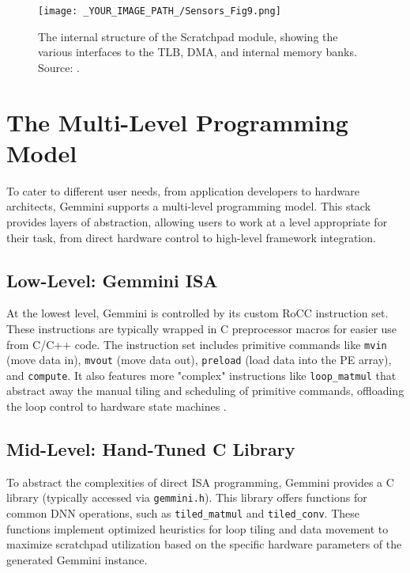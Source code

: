 \begin{figure}[htbp]
    \centering
    \texttt{[image: \_YOUR\_IMAGE\_PATH\_/Sensors\_Fig9.png]}
    \caption{The internal structure of the Scratchpad module, showing the various interfaces to the TLB, DMA, and internal memory banks. Source: \cite{gookyi2023gemmini_case_study}.}
    \label{fig:scratchpad_module}
\end{figure}

\section{The Multi-Level Programming Model}
\label{sec:gemmini_programming_model}

To cater to different user needs, from application developers to hardware architects, Gemmini supports a multi-level programming model. This stack provides layers of abstraction, allowing users to work at a level appropriate for their task, from direct hardware control to high-level framework integration.

\subsection{Low-Level: Gemmini ISA}
At the lowest level, Gemmini is controlled by its custom RoCC instruction set. These instructions are typically wrapped in C preprocessor macros for easier use from C/C++ code. The instruction set includes primitive commands like \texttt{mvin} (move data in), \texttt{mvout} (move data out), \texttt{preload} (load data into the PE array), and \texttt{compute}. It also features more "complex" instructions like \texttt{loop\_matmul} that abstract away the manual tiling and scheduling of primitive commands, offloading the loop control to hardware state machines \cite{Genc2022GemminiMLSys}.

\subsection{Mid-Level: Hand-Tuned C Library}
To abstract the complexities of direct ISA programming, Gemmini provides a C library (typically accessed via \texttt{gemmini.h}). This library offers functions for common DNN operations, such as \texttt{tiled\_matmul} and \texttt{tiled\_conv}. These functions implement optimized heuristics for loop tiling and data movement to maximize scratchpad utilization based on the specific hardware parameters of the generated Gemmini instance.

